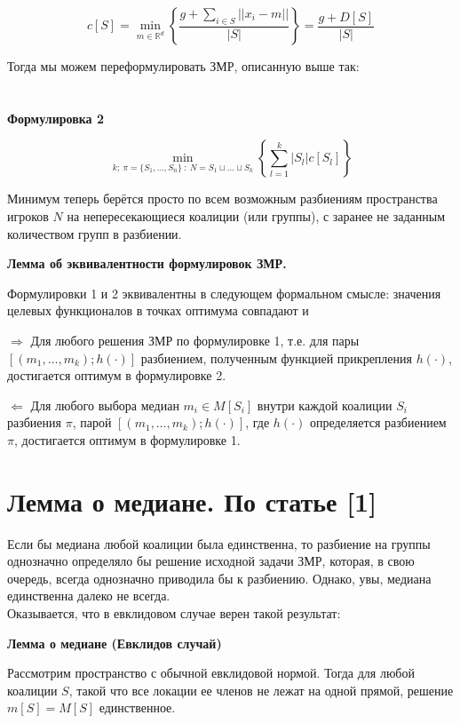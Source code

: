 \documentclass[a4paper,12pt]{article} %
\begin{document}
\[ c[S] = \min \limits_{m \in \mathbb{R}^d} \left\{ \dfrac{g + \sum \limits_{i \in S} \vert \vert x_i - m \vert \vert}{\vert S \vert} \right\} = \dfrac{g + D[S]}{\vert S \vert } \]

Тогда мы можем переформулировать ЗМР, описанную выше так: \\ \\ \\

\textbf{Формулировка 2}

\[ \min \limits_{k; \ \pi=\{ S_1, \dots, S_n \} \ : \ N = S_1 \sqcup \dotsc \sqcup S_k } \left \{ \sum_{l = 1}^{k} \vert S_l \vert c[S_l]  \right \} \]



Минимум теперь берётся просто по всем возможным разбиениям пространства
игроков $N$ на непересекающиеся коалиции (или группы), с заранее не
заданным количеством групп в разбиении.

\textbf{Лемма об эквивалентности формулировок ЗМР. }
\par
Формулировки 1 и 2 эквивалентны в следующем формальном смысле: значения целевых функционалов в точках оптимума совпадают и \par
$\Rightarrow$   Для любого решения ЗМР по формулировке 1, т.е. для пары $[(m_1, \dots, m_k); h(\cdot ) ]$ разбиением, полученным функцией прикрепления $h(\cdot)$,  достигается оптимум в формулировке 2.

$\Leftarrow $ Для любого выбора медиан $m_i \in M[S_i]$ внутри каждой коалиции $S_i$ разбиения  $\pi$, парой $[(m_1, \dots, m_k); h(\cdot)]$, где $h(\cdot)$ определяется разбиением $\pi$, достигается оптимум в формулировке 1.



\section{Лемма о медиане. По статье [1]}
 Если бы медиана любой коалиции была единственна, то разбиение на группы
однозначно определяло бы решение исходной задачи ЗМР, которая, в свою
очередь, всегда однозначно приводила бы к разбиению. Однако, увы, медиана
единственна далеко не всегда. \\
 
 Оказывается, что в евклидовом случае верен такой результат: \par
 \textbf{Лемма о медиане (Евклидов случай)} \par
 Рассмотрим пространство с обычной евклидовой нормой. Тогда для любой коалиции $S$, такой что все локации ее членов не лежат на одной прямой, решение $m[S] = M[S]$ единственное.
 \\
 
\end{document}
